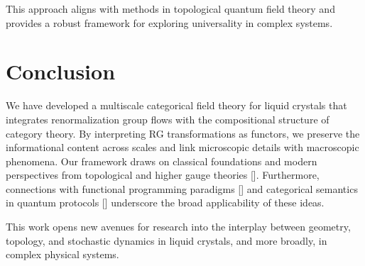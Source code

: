 	This approach aligns with methods in topological quantum field theory \cite{atiyah1988topological, guillemin1984symplectic} and provides a robust framework for exploring universality in complex systems.
	
	\section{Conclusion}
	
	We have developed a multiscale categorical field theory for liquid crystals that integrates renormalization group flows with the compositional structure of category theory. By interpreting RG transformations as functors, we preserve the informational content across scales and link microscopic details with macroscopic phenomena. Our framework draws on classical foundations \cite{maclane1971categories, degennes1993physics} and modern perspectives from topological and higher gauge theories [\cite{atiyah1988topological, segal2004definition, baez2007higher, freed1995chern}]. Furthermore, connections with functional programming paradigms [\cite{hudak1989conception}] and categorical semantics in quantum protocols [\cite{abramsky2004categorical, selinger2007dagger}] underscore the broad applicability of these ideas.
	
	This work opens new avenues for research into the interplay between geometry, topology, and stochastic dynamics in liquid crystals, and more broadly, in complex physical systems.
	
	\newpage
	
	
	

